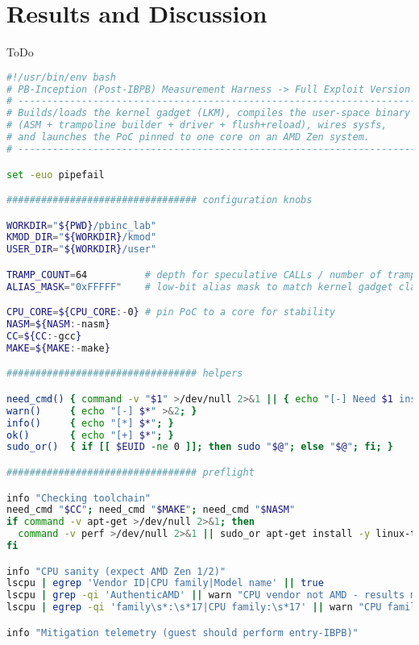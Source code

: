 \documentclass[11pt,a4paper]{article}
\begin{document}
\section{Results and Discussion}
ToDo
\begin{lstlisting}[language=bash, alsolanguage=C]
#!/usr/bin/env bash
# PB-Inception (Post-IBPB) Measurement Harness -> Full Exploit Version
# -----------------------------------------------------------------------------
# Builds/loads the kernel gadget (LKM), compiles the user-space binary
# (ASM + trampoline builder + driver + flush+reload), wires sysfs,
# and launches the PoC pinned to one core on an AMD Zen system.
# -----------------------------------------------------------------------------

set -euo pipefail

################################# configuration knobs

WORKDIR="${PWD}/pbinc_lab"
KMOD_DIR="${WORKDIR}/kmod"
USER_DIR="${WORKDIR}/user"

TRAMP_COUNT=64          # depth for speculative CALLs / number of trampolines
ALIAS_MASK="0xFFFFF"    # low-bit alias mask to match kernel gadget class (tune/spray)

CPU_CORE=${CPU_CORE:-0} # pin PoC to a core for stability
NASM=${NASM:-nasm}
CC=${CC:-gcc}
MAKE=${MAKE:-make}

################################# helpers

need_cmd() { command -v "$1" >/dev/null 2>&1 || { echo "[-] Need $1 installed"; exit 1; }; }
warn()     { echo "[-] $*" >&2; }
info()     { echo "[*] $*"; }
ok()       { echo "[+] $*"; }
sudo_or()  { if [[ $EUID -ne 0 ]]; then sudo "$@"; else "$@"; fi; }

################################# preflight

info "Checking toolchain"
need_cmd "$CC"; need_cmd "$MAKE"; need_cmd "$NASM"
if command -v apt-get >/dev/null 2>&1; then
  command -v perf >/dev/null 2>&1 || sudo_or apt-get install -y linux-tools-common linux-tools-$(uname -r) || true
fi

info "CPU sanity (expect AMD Zen 1/2)"
lscpu | egrep 'Vendor ID|CPU family|Model name' || true
lscpu | grep -qi 'AuthenticAMD' || warn "CPU vendor not AMD - results may be negative"
lscpu | egrep -qi 'family\s*:\s*17|CPU family:\s*17' || warn "CPU family not 17h (Zen1/2) - results may be negative"

info "Mitigation telemetry (guest should perform entry-IBPB)"


\end{lstlisting}
\end{document}
